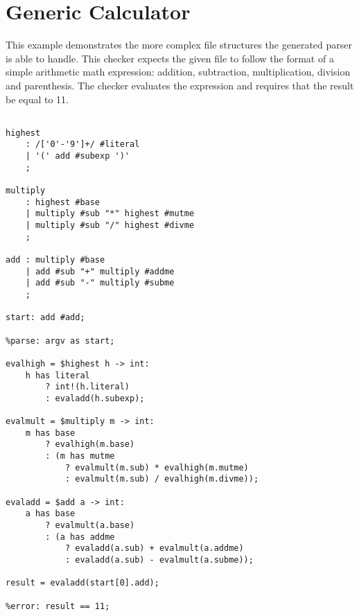 
\section{Generic Calculator}
{

This example demonstrates the more complex file structures the generated
parser is able to handle. This checker expects the given file to follow
the format of a simple arithmetic math expression: addition, subtraction,
multiplication, division and parenthesis. The checker evaluates the expression
and requires that the result be equal to 11.

\begin{lstlisting}[texcl=true, language=MAIA]
%skip: ' ' | '\n';

highest
	: /['0'-'9']+/ #literal
	| '(' add #subexp ')'
	;

multiply
	: highest #base
	| multiply #sub "*" highest #mutme
	| multiply #sub "/" highest #divme
	;

add	: multiply #base
	| add #sub "+" multiply #addme
	| add #sub "-" multiply #subme
	;

start: add #add;

%parse: argv as start;

evalhigh = $highest h -> int:
	h has literal
		? int!(h.literal)
		: evaladd(h.subexp);

evalmult = $multiply m -> int:
	m has base
		? evalhigh(m.base)
		: (m has mutme
			? evalmult(m.sub) * evalhigh(m.mutme)
			: evalmult(m.sub) / evalhigh(m.divme));

evaladd = $add a -> int:
	a has base
		? evalmult(a.base)
		: (a has addme
			? evaladd(a.sub) + evalmult(a.addme)
			: evaladd(a.sub) - evalmult(a.subme));

result = evaladd(start[0].add);

%error: result == 11;
\end{lstlisting}
}










